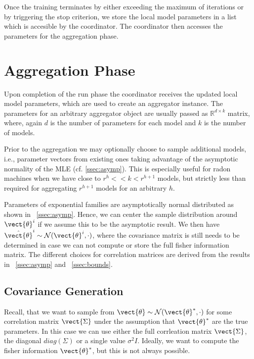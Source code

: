Once the training terminates by either exceeding the maximum of iterations or by triggering the stop criterion, we store the local model parameters in a list which is accesible by the coordinator. 
The coordinator then accesses the parameters for the aggregation phase.


\section{Aggregation Phase}
Upon completion of the run phase the coordinator receives the updated local model parameters, which are used to create an aggregator instance.
The parameters for an arbitrary aggregator object are usually passed as $\mathbb{R}^{d \times k}$ matrix, where, again $d$ is the number of parameters for each model and $k$ is the number of models.


Prior to the aggregation we may optionally choose to sample additional models, i.e., parameter vectors from existing ones taking advantage of the asymptotic normality of the MLE (cf. \ref{ssec:asymp}).
This is especially useful for radon machines when we have close to $ r^h << k < r^{h+1}$ models, but strictly less than required for aggregating $r^{h+1}$ models for an arbitrary $h$.

Parameters of exponential families are asymptotically normal distributed as shown in \sect~\ref{ssec:asymp}.
Hence, we can center the sample distribution around $\vect{\theta}^i$ if we assume this to be the asymptotic result.
We then have $\hat{\vect{\theta}}^i \sim \mathcal{N}(\vect{\theta}^i, \cdot)$, where the covariance matrix is still needs to be determined in case we can not compute or store the full fisher information matrix.
The different choices for correlation matrices are derived from the results in \sect~\ref{ssec:asymp} and \sect~\ref{ssec:bounds}.

\subsection{Covariance Generation}
\label{ssec:covgen}

Recall, that we want to sample from $\vect{\theta} \sim \mathcal{N}(\vect{\theta}^*, \cdot)$ for some correlation matrix $\vect{\Sigma}$ under the assumption that $\vect{\theta}^*$ are the true parameters.
In this case we can use either the full corrleation matrix $\vect{\Sigma}$, the diagonal $diag(\Sigma)$ or a single value $\sigma^2 I$.
Ideally, we want to compute the fisher information \wrt $\vect{\theta}^*$, but this is not always possible.

